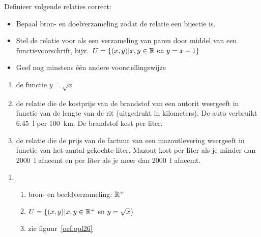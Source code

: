 \begin{oef}\label{oef:26}
Definieer volgende relaties correct:
\begin{itemize}
  \item Bepaal bron- en doelverzameling zodat de relatie een bijectie is.
  \item Stel de relatie voor als een verzameling van paren door middel van een functievoorschrift, bijv.\ $U=\{(x,y)|x,y\in \mathbb{R}\text{ en } y=x+1\}$
  \item Geef nog minstens \'e\'en andere voorstellingswijze
\end{itemize}
\begin{enumerate}
  \item de functie $y=\sqrt{x}$
  \item de relatie die de kostprijs van de brandstof van een autorit weergeeft
        in functie van de lengte van de rit (uitgedrukt in kilometers). De auto
        verbruikt \SI{6,45}{\litre} per \SI{100}{\kilo\meter}. De brandstof kost  per liter.
  \item de relatie die de prijs van de factuur van een mazoutlevering weergeeft
        in functie van het aantal gekochte liter. Mazout kost  per
        liter als je minder dan \SI{2000}{\litre} afneemt en 
        per liter als je meer dan \SI{2000}{\litre} afneemt.
\end{enumerate}
\begin{opl}
\begin{enumerate}
  \item \begin{enumerate}
          \item bron- en beeldverzameling: $\mathbb{R}^+$
          \item $U=\{(x,y)|x,y\in \mathbb{R}^+\text{ en } y=\sqrt{x} \}$
          \item zie figuur~\ref{oef:opl26}
                \begin{figure}[htbp]
                  \centering
\end{figure}
\end{enumerate}
\end{enumerate}
\end{opl}
\end{oef}
